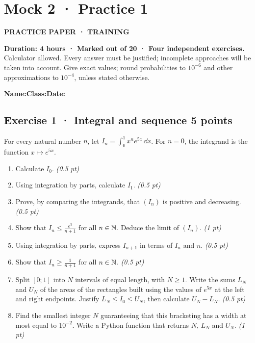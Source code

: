 \clearpage{}\label{sujet:8-1}

\section*{Mock 2 · Practice 1}

{\sffamily\bfseries\color{teal}PRACTICE PAPER · TRAINING\par}

\textbf{Duration: 4 hours · Marked out of 20 · Four independent exercises.}\\Calculator allowed. Every answer must be justified; incomplete approaches will be taken into account. Give exact values; round probabilities to $10^{-6}$ and other approximations to $10^{-4}$, unless stated otherwise.

\smallskip\textbf{Name:}\enspace\dotfill\quad\textbf{Class:}\enspace\dotfill\quad\textbf{Date:}\enspace\dotfill

\subsection*{Exercise 1 · Integral and sequence \hfill 5 points}For every natural number $n$, let $I_n=\displaystyle\int_0^1x^ne^{5x}\,\dd x$. For $n=0$, the integrand is the function $x\mapsto e^{5x}$.

\begin{enumerate}

\item Calculate $I_0$. \hfill\textit{(0.5 pt)}

\item Using integration by parts, calculate $I_1$. \hfill\textit{(0.5 pt)}

\item Prove, by comparing the integrands, that $(I_n)$ is positive and decreasing. \hfill\textit{(0.5 pt)}

\item Show that $I_n\le\frac{e^{5}}{n+1}$ for all $n\in\mathbb N$. Deduce the limit of $(I_n)$. \hfill\textit{(1 pt)}

\item Using integration by parts, express $I_{n+1}$ in terms of $I_n$ and $n$. \hfill\textit{(0.5 pt)}

\item Show that $I_n\ge\frac1{n+1}$ for all $n\in\mathbb N$. \hfill\textit{(0.5 pt)}

\item Split $[0;1]$ into $N$ intervals of equal length, with $N\ge1$. Write the sums $L_N$ and $U_N$ of the areas of the rectangles built using the values of $e^{5x}$ at the left and right endpoints. Justify $L_N\le I_0\le U_N$, then calculate $U_N-L_N$. \hfill\textit{(0.5 pt)}

\item Find the smallest integer $N$ guaranteeing that this bracketing has a width at most equal to $10^{-2}$. Write a Python function that returns $N$, $L_N$ and $U_N$. \hfill\textit{(1 pt)}

\end{enumerate}

